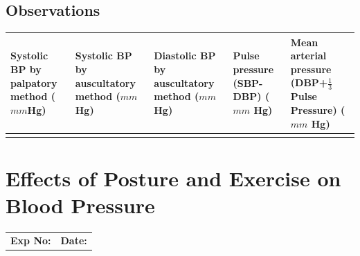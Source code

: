 \documentclass[a4paper,12pt,openany,oneside]{book}
\begin{document}
\section*{Observations}
\begin{table}[H]

		\setlength\extrarowheight{10pt}
	\small{%
	\begin{tabular}{|p{1in}|p{1in}|p{1in}|p{1in}|p{1in}|}
		\hline
		Systolic BP by palpatory method ($mm$Hg) & Systolic BP by auscultatory method ($mm$Hg) & Diastolic BP by auscultatory method ($mm$ Hg) & Pulse pressure (SBP-DBP) ($mm$ Hg) & Mean arterial pressure (DBP+${\frac{1}{3}}$ Pulse Pressure) ($mm$ Hg) \\ \hline
			                                         &                                             &                                               &                                                                              &                                                                                                               \\ \hline
	\end{tabular}
	}
\end{table}
															\chapter*{\centering Effects of Posture and Exercise on	Blood Pressure}
															\begin{tabular}{p{5in} p{1in}}
																\textbf{Exp No:}  & \textbf{Date:}\\
															\end{tabular}
\end{document}
